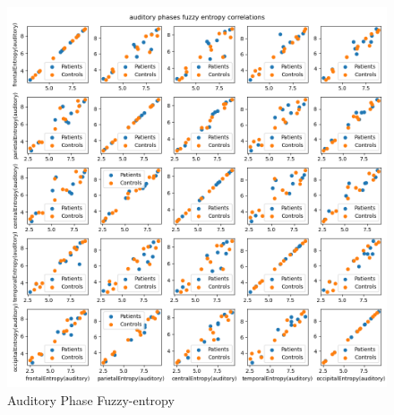 \documentclass[10pt]{article}
\begin{document}
\begin{figure}[H]
  \includegraphics[width=16cm]{../../../data_analysis_results/FuzzEnt/auditory_phases_corr.png}
  \caption{Auditory Phase Fuzzy-entropy}\label{auditory_fuzz}
\end{figure}
\end{document}
